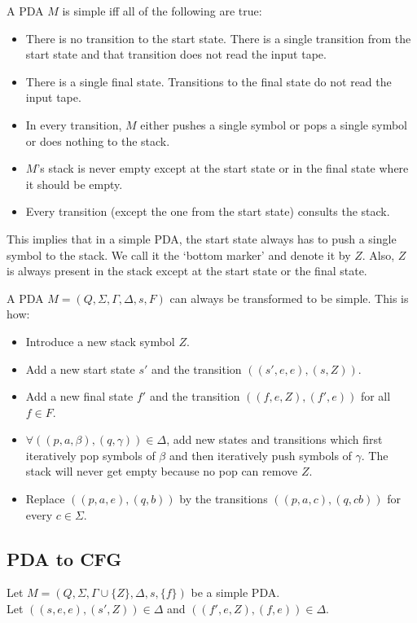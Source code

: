 A PDA $M$ is simple iff all of the following are true:
\begin{itemize}
\item There is no transition to the start state.
    There is a single transition from the start state
    and that transition does not read the input tape.
\item There is a single final state.
    Transitions to the final state do not read the input tape.
\item In every transition, $M$ either pushes a single symbol or pops a single symbol or does nothing to the stack.
\item $M$'s stack is never empty except at the start state or in the final state where it should be empty.
\item Every transition (except the one from the start state) consults the stack.
\end{itemize}

This implies that in a simple PDA,
the start state always has to push a single symbol to the stack.
We call it the `bottom marker' and denote it by $Z$.
Also, $Z$ is always present in the stack except at the start state or the final state.

A PDA $M = (Q, \Sigma, \Gamma, \Delta, s, F)$
can always be transformed to be simple. This is how:
\begin{itemize}
\item Introduce a new stack symbol $Z$.
\item Add a new start state $s'$ and the transition $((s', e, e), (s, Z))$.
\item Add a new final state $f'$ and the transition $((f, e, Z), (f', e))$ for all $f \in F$.
\item $\forall ((p, a, \beta), (q, \gamma)) \in \Delta$, add new states and transitions which
    first iteratively pop symbols of $\beta$ and then iteratively push symbols of $\gamma$.
    The stack will never get empty because no pop can remove $Z$.
\item Replace $((p, a, e), (q, b))$ by the transitions $((p, a, c), (q, cb))$ for every $c \in \Sigma$.
\end{itemize}

\subsection{PDA to CFG}

Let $M = (Q, \Sigma, \Gamma \cup \{Z\}, \Delta, s, \{f\})$ be a simple PDA.\\
Let $((s,e,e), (s',Z)) \in \Delta$ and $((f',e,Z), (f,e)) \in \Delta$.

